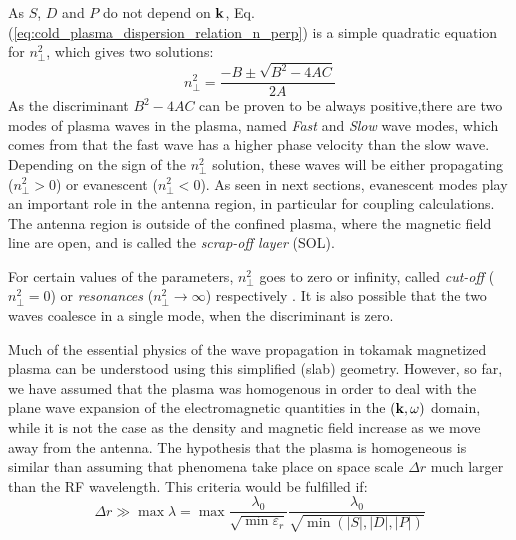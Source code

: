 As $S$, $D$ and $P$ do not depend on ${\mathbf k}$, Eq.(\ref{eq:cold_plasma_dispersion_relation_n_perp}) is a simple quadratic equation for $n_\perp^2$, which gives two solutions:
\begin{equation}
	n_\perp^2 
	=
	\frac{-B \pm  \sqrt{B^2 - 4AC}}{2A}
	\label{eq:nperp_solution_general}
\end{equation}
As the discriminant $B^2 - 4AC$ can be proven to be always positive,there are two modes of plasma waves in the plasma, named \textit{Fast} and \textit{Slow} wave modes, which comes from that the fast wave has a higher phase velocity than the slow wave. Depending on the sign of the $n_\perp^2$ solution, these waves will be either propagating ($n_\perp^2>0$) or evanescent ($n_\perp^2<0$). As seen in next sections, evanescent modes play an important role in the antenna region, in particular for coupling calculations. The antenna region is outside of the confined plasma, where the magnetic field line are open, and is called the \textit{scrap-off layer} (SOL). 


For certain values of the parameters, $n_\perp^2$ goes to zero or infinity, called \textit{cut-off} ($n_\perp^2 = 0$) or \textit{resonances} ($n_\perp^2\to\infty$) respectively . It is also possible that the two waves coalesce in a single mode, when the discriminant is zero. 

Much of the essential physics of the wave propagation in tokamak magnetized plasma can be understood using this simplified (slab) geometry. However, so far, we have assumed that the plasma was homogenous in order to deal with the plane wave expansion of the electromagnetic quantities in the $({\mathbf k},\omega)$ domain, while it is not the case as the density and magnetic field increase as we move away from the antenna. The hypothesis that the plasma is homogeneous is similar than assuming that phenomena take place on space scale $\Delta r$ much larger than the RF wavelength. This criteria would be fulfilled if:
\begin{equation}
	\Delta r \gg \max\lambda= \max \frac{\lambda_0}{\sqrt{\min \varepsilon_{r}}}\frac{\lambda_0}{\sqrt{\min\left(|S|,|D|,|P|\right)}}
\end{equation}




